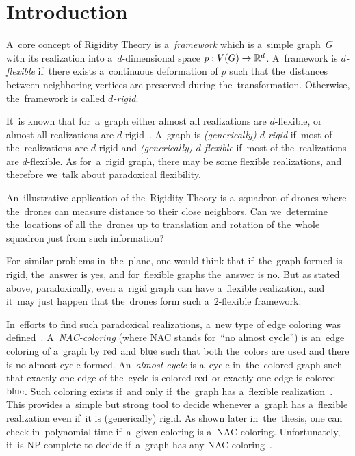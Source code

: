 
\chapter*{Introduction}
\setcounter{page}{1}


A~core concept of Rigidity Theory is a~\emph{framework} which is
a~simple graph~\(G\) with its realization
into a~\(d\)-dimensional space \(p: V(G) \to \mathbb{R}^d\).
A~framework is \emph{\( d \)-flexible} if~there exists
a~continuous deformation of \( p \) such that
the~distances between neighboring vertices are preserved during the~transformation.
Otherwise, the~framework is called \emph{\( d \)-rigid}.

It~is known that for~a~graph either almost all realizations are \( d \)-flexible,
or almost all realizations are \( d \)-rigid~\cite{generically_rigid_graphs}.
A~graph is \emph{(generically) \( d \)-rigid} if~most of the~realizations are \( d \)-rigid
and \emph{(generically) \( d \)-flexible} if~most of the~realizations are \( d \)-flexible.
%
As for~a~rigid graph,
there may be some flexible realizations,
and therefore we~talk about paradoxical flexibility.

An~illustrative application of the~Rigidity Theory is a~squadron of drones
where the~drones can measure distance to their close neighbors.
Can we~determine the~locations of all the~drones
up to translation and rotation of the~whole squadron
just from such information?

For~similar problems in~the~plane,
one would think that if~the~graph formed is rigid, the~answer is yes, and
for~flexible graphs the~answer is no.
But as stated above, paradoxically, even a~rigid graph can have a~flexible realization,
and it~may just happen that the~drones form such a~\( 2 \)-flexible framework.

In~efforts to find such paradoxical realizations,
a~new type of edge coloring was defined~\cite{legersky_original}.
A~\emph{NAC-coloring} (where NAC stands for~``no almost cycle'')
is an~edge coloring of a~graph by \( \text{red} \) and \( \text{blue} \)
such that both the~colors are used and there is no almost cycle formed.
An~\emph{almost cycle} is a~cycle in~the~colored graph such that exactly one
edge of the~cycle is colored \( \text{red} \) or exactly one edge is colored \( \text{blue} \).
Such coloring exists if~and only if~the~graph has a~flexible realization~\cite{legersky_original}.
This provides a~simple but strong tool to decide whenever a~graph has
a~flexible realization even if~it is (generically) rigid.
As shown later in~the~thesis, one can check in~polynomial time
if~a~given coloring is a~NAC-coloring.
Unfortunately, it~is NP-complete to decide if~a~graph has any NAC-coloring~\cite{np_complete}.

